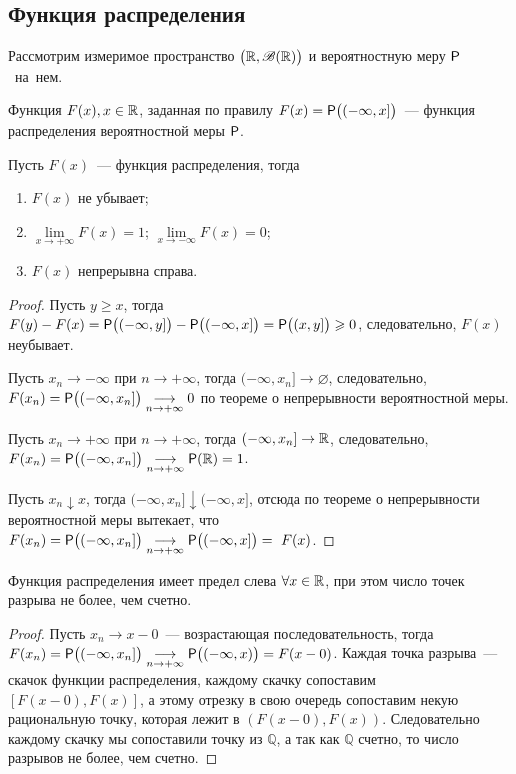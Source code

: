 \subsection{Функция распределения}

Рассмотрим измеримое пространство $\big(\R, \B(\R)\big)$ и вероятностную меру $\P$~на~нем.
\begin{definition}
	Функция $F(x), x \in \R$, заданная по правилу $F(x) = \P \big( (-\infty, x] \big)$~--- функция распределения вероятностной меры  $\P$.
\end{definition}
\begin{lemma}
	Пусть $F(x)$~--- функция распределения, тогда
	\begin{enumerate}
		\item $F(x)$ не убывает;
		\item $\lim\limits_{x \rightarrow +\infty} F(x) = 1$; $\lim\limits_{x \rightarrow -\infty} F(x) = 0$;
		\item $F(x)$ непрерывна справа.
	\end{enumerate}
	\begin{proof}
		Пусть $y \geqslant x$, тогда $F(y) - F(x) = \P \big( (-\infty, y] \big) - \P \big( (-\infty, x] \big) = \P \big( (x, y] \big) \geqslant 0$, следовательно, $F(x)$ неубывает.
		
		Пусть $x_n \rightarrow -\infty$ при $n \rightarrow +\infty$, тогда $(-\infty, x_n] \rightarrow \varnothing$, следовательно, $F(x_n) = \P \big( (-\infty, x_n] \big) \underset{n \rightarrow +\infty}{\longrightarrow} 0$ по теореме о непрерывности вероятностной меры. 
		
		Пусть $x_n \rightarrow +\infty$ при $n \rightarrow +\infty$, тогда $(-\infty, x_n] \rightarrow \R$, следовательно, $F(x_n) = \P \big( (-\infty, x_n] \big) \underset{n \rightarrow +\infty}{\longrightarrow} \P(\R) = 1$.
				
		Пусть $x_n \downarrow x$, тогда $(-\infty, x_n] \downarrow (-\infty, x]$, отсюда по теореме о непрерывности вероятностной меры вытекает, что $F(x_n) = \P \big( (-\infty, x_n] \big) \underset{n \rightarrow +\infty}{\longrightarrow} \P \big( (-\infty, x] \big) =~F(x)$.
	\end{proof}
\end{lemma}
\begin{property}
	Функция распределения имеет предел слева $\forall x \in \R$, при этом число точек разрыва не более, чем счетно.
	\begin{proof}
		Пусть $x_n \rightarrow x - 0$~--- возрастающая последовательность, тогда $F(x_n) = \P \big( (-\infty, x_n] \big) \underset{n \rightarrow +\infty}{\longrightarrow} \P \big( (-\infty, x) \big) = F(x - 0)$. Каждая точка разрыва~--- скачок функции распределения, каждому скачку сопоставим $[F(x-0), F(x)]$, а этому отрезку в свою очередь сопоставим некую рациональную точку, которая лежит в $(F(x-0), F(x))$. Следовательно каждому скачку мы сопоставили точку из $\mathbb{Q}$, а так как $\mathbb{Q}$ счетно, то число разрывов не более, чем счетно.
	\end{proof}
\end{property}
